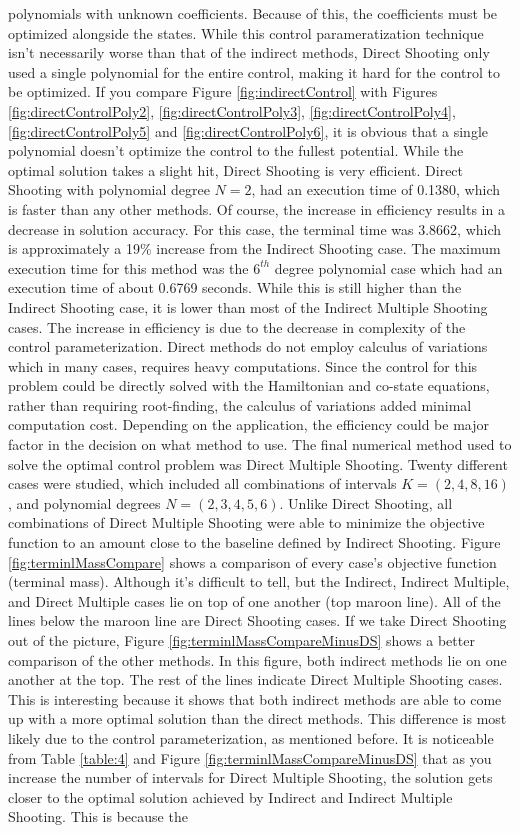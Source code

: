 \documentclass[]{article}
\begin{document}
polynomials with unknown coefficients. Because of this, the coefficients must be optimized alongside the states. While this control parameratization technique isn't necessarily worse than that of the indirect methods, Direct Shooting only used a single polynomial for the entire control, making it hard for the control to be optimized. If you compare Figure \ref{fig:indirectControl} with Figures \ref{fig:directControlPoly2}, \ref{fig:directControlPoly3}, \ref{fig:directControlPoly4}, \ref{fig:directControlPoly5} and \ref{fig:directControlPoly6}, it is obvious that a single polynomial doesn't optimize the control to the fullest potential. While the optimal solution takes a slight hit, Direct Shooting is very efficient. Direct Shooting with polynomial degree \(N = 2\), had an execution time of 0.1380, which is faster than any other methods. Of course, the increase in efficiency results in a decrease in solution accuracy. For this case, the terminal time was 3.8662, which is approximately a 19\% increase from the Indirect Shooting case. The maximum execution time for this method was the \(6^{th}\) degree polynomial case which had an execution time of about 0.6769 seconds. While this is still higher than the Indirect Shooting case, it is lower than most of the Indirect Multiple Shooting cases. The increase in efficiency is due to the decrease in complexity of the control parameterization. Direct methods do not employ calculus of variations which in many cases, requires heavy computations. Since the control for this problem could be directly solved with the Hamiltonian and co-state equations, rather than requiring root-finding, the calculus of variations added minimal computation cost. Depending on the application, the efficiency could be major factor in the decision on what method to use. The final numerical method used to solve the optimal control problem was Direct Multiple Shooting. Twenty different cases were studied, which included all combinations of intervals \(K = (2,4,8,16)\), and polynomial degrees \(N = (2,3,4,5,6)\). Unlike Direct Shooting, all combinations of Direct Multiple Shooting were able to minimize the objective function to an amount close to the baseline defined by Indirect Shooting. Figure \ref{fig:terminlMassCompare} shows a comparison of every case's objective function (terminal mass). Although it's difficult to tell, but the Indirect, Indirect Multiple, and Direct Multiple cases lie on top of one another (top maroon line). All of the lines below the maroon line are Direct Shooting cases. If we take Direct Shooting out of the picture, Figure \ref{fig:terminlMassCompareMinusDS} shows a better comparison of the other methods. In this figure, both indirect methods lie on one another at the top. The rest of the lines indicate Direct Multiple Shooting cases. This is interesting because it shows that both indirect methods are able to come up with a more optimal solution than the direct methods. This difference is most likely due to the control parameterization, as mentioned before. It is noticeable from Table \ref{table:4} and Figure \ref{fig:terminlMassCompareMinusDS} that as you increase the number of intervals for Direct Multiple Shooting, the solution gets closer to the optimal solution achieved by Indirect and Indirect Multiple Shooting. This is because the 
\end{document}
